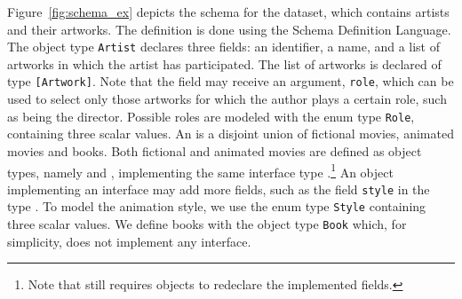 Figure~\ref{fig:schema_ex} depicts the schema for the \goodbois dataset, which contains
artists and their artworks. The definition is done using the \gql
Schema Definition Language.
The object type \texttt{Artist} declares three fields: 
an identifier, a name, and a list of artworks
in which the artist has participated. The list of artworks is declared of type 
\texttt{[Artwork]}. Note that the field may receive an argument, \texttt{role}, which can be used to select only those artworks for which the author plays a certain role, such as being the director. Possible roles are modeled with the enum type \texttt{Role}, containing three scalar values.
An \artwork is a disjoint union of fictional movies, animated movies and books.
Both fictional and animated movies are defined as object types, namely \fiction and 
\animation, implementing the same interface type \movies.\footnote{Note that \gql still requires objects to redeclare the implemented fields.}
An object implementing an interface may add more fields, such as the field \texttt{style} in the type \animation. 
To model the animation style, we use the enum type \texttt{Style} containing
three scalar values. 
We define books with the object type \texttt{Book} which, for simplicity, does not implement any interface.

